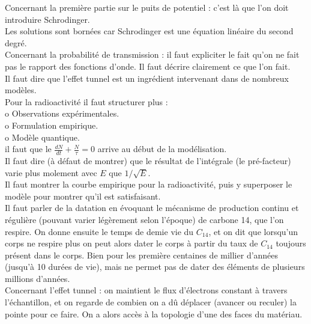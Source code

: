 \documentclass[12pt,prb,aps,epsf]{article}
\begin{document}
Concernant la première partie sur le puits de potentiel : c'est là que l'on doit introduire Schrodinger. \\

Les solutions sont bornées car Schrodinger est une équation linéaire du second degré.\\

Concernant la probabilité de transmission : il faut expliciter le fait qu'on ne fait pas le rapport des fonctions d'onde. Il faut décrire clairement ce que l'on fait.\\

Il faut dire que l'effet tunnel est un ingrédient intervenant dans de nombreux modèles.\\

Pour la radioactivité il faut structurer plus :\\
o Observations expérimentales.\\
o Formulation empirique.\\
o Modèle quantique.\\
il faut que le $\frac{dN}{dt} + \frac{N}{\tau} = 0$ arrive au début de la modélisation.\\

Il faut dire (à défaut de montrer) que le résultat de l'intégrale (le pré-facteur) varie plus molement avec $E$ que $1/\sqrt{E}$.\\
Il faut montrer la courbe empirique pour la radioactivité, puis y superposer le modèle pour montrer qu'il est satisfaisant.\\

Il faut parler de la datation en évoquant le mécanisme de production continu et régulière (pouvant varier légèrement selon l'époque) de carbone 14, que l'on respire. On donne ensuite le temps de demie vie du $C_{14}$, et on dit que lorsqu'un corps ne respire plus on peut alors dater le corps à partir du taux de $C_{14}$ toujours présent dans le corps. Bien pour les première centaines de millier d'années (jusqu'à 10 durées de vie), mais ne permet pas de dater des éléments de plusieurs millions d'années.\\

Concernant l'effet tunnel : on maintient le flux d'électrons constant à travers l'échantillon, et on regarde de combien on a dû déplacer (avancer ou reculer) la pointe pour ce faire. On a alors accès à la topologie d'une des faces du matériau.



	
\end{document}
